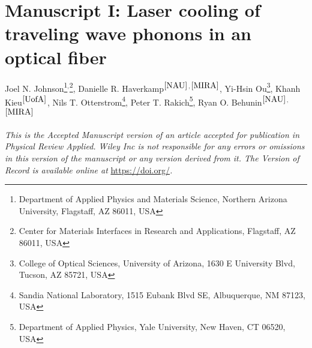 \setcounter{rownumber}{0}
\singlespacing
\chapter{Manuscript I: Laser cooling of traveling wave phonons in an optical fiber}
\label{ch:Cooling}
\acresetall



Joel N. Johnson\footnote{\label{NAU}
Department of Applied Physics and Materials Science, Northern Arizona University, Flagstaff, AZ 86011, USA
}$^,$\footnote{\label{MIRA}
Center for Materials Interfaces in Research and Applications, Flagstaff, AZ 86011, USA
},
Danielle R. Haverkamp$^\mathrm{\ref{NAU}}$$^,$$^\mathrm{\ref{MIRA}}$,
Yi-Hsin Ou\footnote{\label{UofA}
College of Optical Sciences, University of Arizona, 1630 E University Blvd, Tucson, AZ 85721, USA
},
Khanh Kieu$^\mathrm{\ref{UofA}}$,
Nils T. Otterstrom\footnote{\label{Sandia}
Sandia National Laboratory, 1515 Eubank Blvd SE, Albuquerque, NM 87123, USA
},
Peter T. Rakich\footnote{\label{Yale}
Department of Applied Physics, Yale University, New Haven, CT 06520, USA
},
Ryan O. Behunin$^\mathrm{\ref{NAU}}$$^,$$^\mathrm{\ref{MIRA}}$

\hfill


\textit{This is the Accepted Manuscript version of an article accepted for publication in Physical Review Applied. Wiley Inc is not responsible for any errors or omissions in this version of the manuscript or any version derived from it. The Version of Record is available online at} \url{https://doi.org/}\textit{.}

\doublespacing


